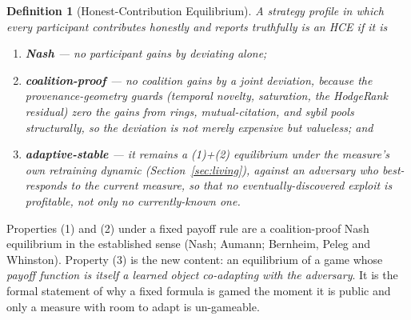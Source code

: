 \documentclass[10pt]{article}
\newtheorem{definition}{Definition}
\begin{document}
\begin{definition}[Honest-Contribution Equilibrium]
A strategy profile in which every participant contributes honestly and reports truthfully is an HCE if
it is
\begin{enumerate}[leftmargin=1.6em,itemsep=1pt,topsep=2pt]
\item \textbf{Nash} --- no participant gains by deviating alone;
\item \textbf{coalition-proof} --- no coalition gains by a joint deviation, because the
provenance-geometry guards (temporal novelty, saturation, the HodgeRank residual) zero the gains from
rings, mutual-citation, and sybil pools \emph{structurally}, so the deviation is not merely expensive
but valueless; and
\item \textbf{adaptive-stable} --- it remains a (1)+(2) equilibrium under the measure's own
retraining dynamic (Section~\ref{sec:living}), against an adversary who best-responds to the
\emph{current} measure, so that no \emph{eventually-discovered} exploit is profitable, not only no
\emph{currently-known} one.
\end{enumerate}
\end{definition}

\noindent
Properties (1) and (2) under a fixed payoff rule are a coalition-proof Nash equilibrium in the
established sense (Nash; Aumann; Bernheim, Peleg and Whinston). Property (3) is the new content: an
equilibrium of a game whose \emph{payoff function is itself a learned object co-adapting with the
adversary}. It is the formal statement of why a fixed formula is gamed the moment it is public and only
a measure with room to adapt is un-gameable.
\end{document}
